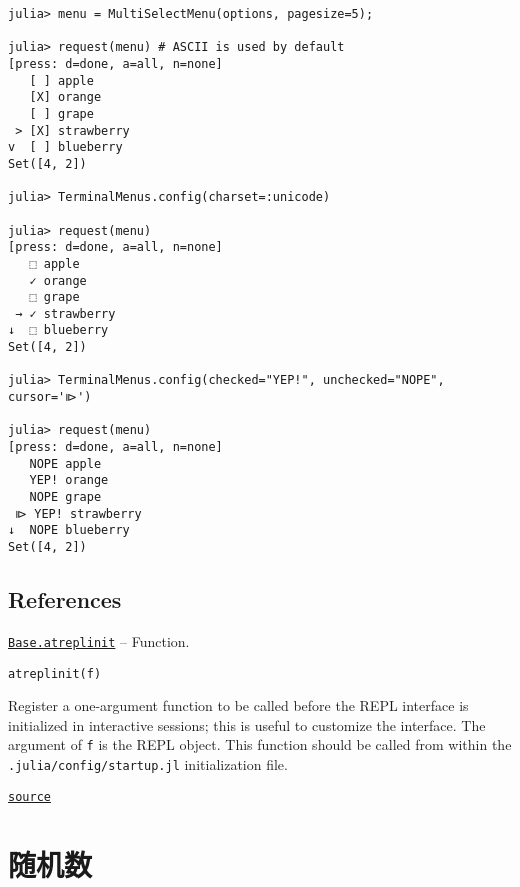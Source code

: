 \begin{verbatim}
julia> menu = MultiSelectMenu(options, pagesize=5);

julia> request(menu) # ASCII is used by default
[press: d=done, a=all, n=none]
   [ ] apple
   [X] orange
   [ ] grape
 > [X] strawberry
v  [ ] blueberry
Set([4, 2])

julia> TerminalMenus.config(charset=:unicode)

julia> request(menu)
[press: d=done, a=all, n=none]
   ⬚ apple
   ✓ orange
   ⬚ grape
 → ✓ strawberry
↓  ⬚ blueberry
Set([4, 2])

julia> TerminalMenus.config(checked="YEP!", unchecked="NOPE", cursor='⧐')

julia> request(menu)
[press: d=done, a=all, n=none]
   NOPE apple
   YEP! orange
   NOPE grape
 ⧐ YEP! strawberry
↓  NOPE blueberry
Set([4, 2])

\end{verbatim}



\hypertarget{13487828328085508990}{}


\section{References}


\hypertarget{1741947168860119796}{} 
\hyperlink{1741947168860119796}{\texttt{Base.atreplinit}}  -- {Function.}

\begin{adjustwidth}{2em}{0pt}


\begin{verbatim}
atreplinit(f)
\end{verbatim}

Register a one-argument function to be called before the REPL interface is initialized in interactive sessions; this is useful to customize the interface. The argument of \texttt{f} is the REPL object. This function should be called from within the \texttt{.julia/config/startup.jl} initialization file.



\href{https://github.com/JuliaLang/julia/blob/44fa15b1502a45eac76c9017af94332d4557b251/base/client.jl#L326-L333}{\texttt{source}}


\end{adjustwidth}

\hypertarget{686205674013349701}{}


\chapter{随机数}





